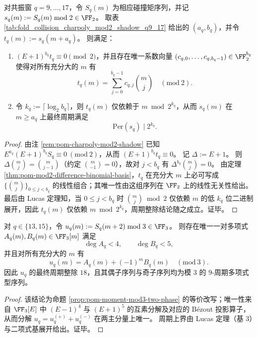 \begin{theorem}[模 \(2\) 的有限比特决定性与最终周期上界]\label{thm:pom-resonance-mod2-finite-bit-automaticity}
对共振窗 \(q=9,\dots,17\)，令 \(S_q(m)\) 为相应碰撞矩序列，并记 \(s_q(m):=S_q(m)\bmod 2\in\FF_2\)。
取表 \ref{tab:fold_collision_charpoly_mod2_shadow_q9_17} 给出的 \((a_q,b_q)\)，并令 \(t_q(m):=s_q(m+a_q)\)。
则满足：
\begin{enumerate}
  \item \((E+1)^{b_q}t_q\equiv 0\pmod 2\)，并且存在唯一系数向量 \((c_{q,0},\dots,c_{q,b_q-1})\in\FF_2^{b_q}\) 使得对所有充分大的 \(m\) 有
  \[
  t_q(m)=\sum_{j=0}^{b_q-1}c_{q,j}\binom{m}{j}\quad(\mathrm{mod}\ 2).
  \]
  \item 令 \(k_q:=\lceil\log_2 b_q\rceil\)，则 \(t_q(m)\) 仅依赖于 \(m\bmod 2^{k_q}\)，从而 \(s_q(m)\) 在 \(m\ge a_q\) 上最终周期满足
  \[
  \mathrm{Per}(s_q)\mid 2^{k_q}.
  \]
\end{enumerate}
\end{theorem}
\begin{proof}
由注 \ref{rem:pom-charpoly-mod2-shadow} 已知
\(
E^{a_q}(E+1)^{b_q}S_q\equiv 0\ (\mathrm{mod}\ 2)
\)，从而 \((E+1)^{b_q}t_q\equiv 0\)。
记 \(\Delta:=E+1\)。
则 \(\Delta\binom{m}{j}=\binom{m}{j-1}\)（约定 \(\binom{m}{-1}=0\)），故对 \(j<b_q\) 有 \(\Delta^{b_q}\binom{m}{j}=0\)。
由定理 \ref{thm:pom-mod2-difference-binomial-basis}，\(t_q\) 在充分大 \(m\) 上必可写成 \(\{\binom{m}{j}\}_{0\le j<b_q}\) 的线性组合；其唯一性由这组序列在 \(\FF_2\) 上的线性无关性给出。
最后由 Lucas 定理知，当 \(0\le j<b_q\) 时 \(\binom{m}{j}\bmod 2\) 仅依赖 \(m\) 的低 \(k_q\) 位二进制展开，因此 \(t_q(m)\) 仅依赖 \(m\bmod 2^{k_q}\)，周期整除结论随之成立。证毕。
\end{proof}

\begin{theorem}\label{thm:pom-resonance-mod3-two-phase-period-q13-15}
对 \(q\in\{13,15\}\)，令 \(u_q(m):=S_q(m+2)\bmod 3\in\FF_3\)。
则存在唯一一对多项式 \(A_q(m),B_q(m)\in\FF_3[m]\) 满足
\[
\deg A_q<4,\qquad \deg B_q<5,
\]
并且对所有充分大的 \(m\) 有
\[
u_q(m)=A_q(m)+(-1)^m B_q(m)\quad(\mathrm{mod}\ 3).
\]
因此 \(u_q\) 的最终周期整除 \(18\)，且其偶子序列与奇子序列均为模 \(3\) 的 \(9\)-周期多项式型序列。
\end{theorem}
\begin{proof}
该结论为命题 \ref{prop:pom-moment-mod3-two-phase} 的等价改写；唯一性来自 \(\FF_3[E]\) 中 \((E-1)^4\) 与 \((E+1)^5\) 的互素分解及对应的 Bézout 投影算子，从而分解 \(u_q=u_q^{(+)}+u_q^{(-)}\) 在两主分量上唯一。
周期上界由 Lucas 定理（基 \(3\)）与二项式基展开给出。证毕。
\end{proof}


